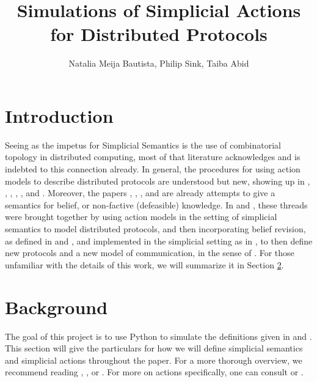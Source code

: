 \documentclass[11pt]{article}
\title{Simulations of Simplicial Actions for Distributed Protocols}
\author{Natalia Meija Bautista, Philip Sink, Taiba Abid}
\date{}
\theoremstyle{definition}
\begin{document}
	
	\maketitle
	
	\begin{abstract}
		

		
	\end{abstract}
	
	\section{Introduction} \label{sec:int}
	
	Seeing as the impetus for Simplicial Semantics is the use of combinatorial topology in distributed computing, most of that literature acknowledges and is indebted to this connection already. \cite{Death,DoA,KaSC,SimpDEL,HG,FA,DCTCT,CACHIN2025114902,Roho_2025,Lehnherr_2025} In general, the procedures for using action models to describe distributed protocols are understood but new, showing up in \cite{SimpDEL}, \cite{KaSC}, \cite{KaG}, \cite{ActionDC}, \cite{CPM}, and \cite{CPaAM}. Moreover, the papers \cite{KaSC}, \cite{BelSimp}, \cite{HGD}, and \cite{SimpBel} are already attempts to give a semantics for belief, or non-factive (defeasible) knowledge. In \cite{TechMemo} and \cite{SimpAct}, these threads were brought together by using action models in the setting of simplicial semantics to model distributed protocols, and then incorporating belief revision, as defined in \cite{Lewis2} and \cite{Stalnaker1981}, and implemented in the simplicial setting as in \cite{SimpBelRev}, to then define new protocols and a new model of communication, in the sense of \cite{TopPersp}. For those unfamiliar with the details of this work, we will summarize it in Section \ref{sec:back}.
	
	\section{Background}\label{sec:back}
	
	The goal of this project is to use Python to simulate the definitions given in \cite{TechMemo} and \cite{SimpAct}. This section will give the particulars for how we will define simplicial semantics and simplicial actions throughout the paper. For a more thorough overview, we recommend reading \cite{KaSC}, \cite{BelSimp}, or \cite{SimpBelRev}. For more on actions specifically, one can consult \cite{TechMemo} or \cite{SimpAct}.
	
\end{document}
